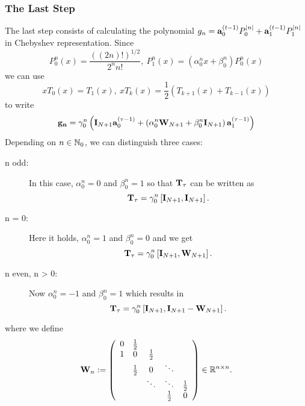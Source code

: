 \subsubsection{The Last Step}
The last step consists of calculating the polynomial $g_{n} = \mathbf{a}_{0}^{(t-1)} P_{0}^{|n|} + \mathbf{a}_{1}^{(t-1)} P_{1}^{|n|}$ in Chebyshev representation. Since 
$$P_{0}^n(x) = \frac{\left( \left( 2n \right) ! \right)^{1/2}}{2^n n!},\ P_{1}^n(x) = \left(\alpha_{0}^nx + \beta_{0}^n\right)P_{0}^n(x)$$ we can use 
$$xT_{0}(x) = T_{1}(x),\ xT_{k}(x) = \frac{1}{2}\left( T_{k+1}(x) + T_{k-1}(x) \right)$$ to write
$$ \mathbf{g_{n}} = \gamma_{0}^n \left( \mathbf{I}_{N+1} \mathbf{a}_{0}^{(\tau-1)} + \left( \alpha_{0}^n\mathbf{W}_{N+1} + \beta_{0}^n\mathbf{I}_{N+1} \right) \mathbf{a}_{1}^{(\tau-1)} \right)$$
Depending on $n \in \mathbb{N}_{0}$, we can distinguish three cases:
\begin{description}
  \item[n odd:] In this case, $\alpha_{0}^n = 0$ and $\beta_{0}^n = 1$ so that $\mathbf{T}_{\tau}$ can be written as $$\mathbf{T}_{\tau} = \gamma_{0}^n \left[ \mathbf{I}_{N+1}, \mathbf{I}_{N+1} \right].$$
  \item[n = 0:] Here it holds, $\alpha_{0}^n = 1$ and $\beta_{0}^n = 0$ and we get $$\mathbf{T}_{\tau} = \gamma_{0}^n \left[ \mathbf{I}_{N+1}, \mathbf{W}_{N+1} \right].$$
  \item[n even, n > 0:] Now $\alpha_{0}^n = -1$ and $\beta_{0}^n = 1$ which results in $$\mathbf{T}_{\tau} = \gamma_{0}^n \left[ \mathbf{I}_{N+1}, \mathbf{I}_{N+1} - \mathbf{W}_{N+1} \right].$$
\end{description}
where we define
$$
\mathbf{W}_{n} :=
\left(
\begin{array}{ccccccc}
  0 & \frac{1}{2} &             &                           \\
  1 &           0 & \frac{1}{2} &                           \\
    & \frac{1}{2} &           0 & \ddots                    \\
    &             &      \ddots & \ddots      & \frac{1}{2} \\
    &             &             & \frac{1}{2} &           0
\end{array}
\right)
\in \mathbb{R}^{n \times n}.
$$

